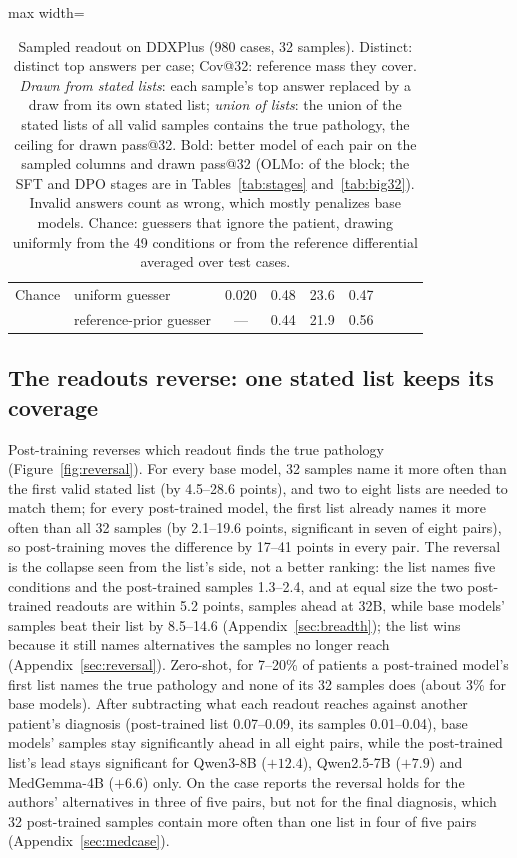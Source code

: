 \documentclass[wcp]{jmlr}
\begin{document}
\begin{table}[t]
\begin{adjustbox}{max width=\linewidth}
\begin{tabular}{llccccccc}
\midrule
Chance & uniform guesser & 0.020 & 0.48 & 23.6 & 0.47 & & & \\
 & reference-prior guesser & --- & 0.44 & 21.9 & 0.56 & & & \\
\bottomrule
\end{tabular}
\end{adjustbox}
\caption{Sampled readout on DDXPlus (980 cases, 32 samples). Distinct: distinct top answers per case; Cov@32: reference mass they cover. \emph{Drawn from stated lists}: each sample's top answer replaced by a draw from its own stated list; \emph{union of lists}: the union of the stated lists of all valid samples contains the true pathology, the ceiling for drawn pass@32. Bold: better model of each pair on the sampled columns and drawn pass@32 (OLMo: of the block; the SFT and DPO stages are in Tables~\ref{tab:stages} and~\ref{tab:big32}). Invalid answers count as wrong, which mostly penalizes base models. Chance: guessers that ignore the patient, drawing uniformly from the 49 conditions or from the reference differential averaged over test cases.}
\label{tab:sampled}
\end{table}

\subsection{The readouts reverse: one stated list keeps its coverage}\label{sec:stated}
Post-training reverses which readout finds the true pathology (Figure~\ref{fig:reversal}). For every base model, 32 samples name it more often than the first valid stated list (by 4.5--28.6 points), and two to eight lists are needed to match them; for every post-trained model, the first list already names it more often than all 32 samples (by 2.1--19.6 points, significant in seven of eight pairs), so post-training moves the difference by 17--41 points in every pair. The reversal is the collapse seen from the list's side, not a better ranking: the list names five conditions and the post-trained samples 1.3--2.4, and at equal size the two post-trained readouts are within 5.2 points, samples ahead at 32B, while base models' samples beat their list by 8.5--14.6 (Appendix~\ref{sec:breadth}); the list wins because it still names alternatives the samples no longer reach (Appendix~\ref{sec:reversal}). Zero-shot, for 7--20\% of patients a post-trained model's first list names the true pathology and none of its 32 samples does (about 3\% for base models). After subtracting what each readout reaches against another patient's diagnosis (post-trained list 0.07--0.09, its samples 0.01--0.04), base models' samples stay significantly ahead in all eight pairs, while the post-trained list's lead stays significant for Qwen3-8B ($+12.4$), Qwen2.5-7B ($+7.9$) and MedGemma-4B ($+6.6$) only. On the case reports the reversal holds for the authors' alternatives in three of five pairs, but not for the final diagnosis, which 32 post-trained samples contain more often than one list in four of five pairs (Appendix~\ref{sec:medcase}).
\end{document}
